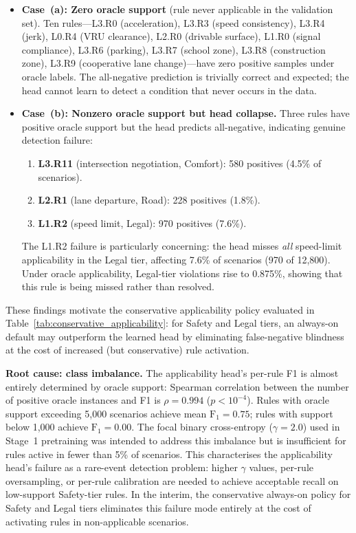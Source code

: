 \begin{itemize}[leftmargin=1.5em]
\item \textbf{Case~(a): Zero oracle support} (rule never applicable in the validation set).  Ten rules---L3.R0 (acceleration), L3.R3 (speed consistency), L3.R4 (jerk), L0.R4 (VRU clearance), L2.R0 (drivable surface), L1.R0 (signal compliance), L3.R6 (parking), L3.R7 (school zone), L3.R8 (construction zone), L3.R9 (cooperative lane change)---have zero positive samples under oracle labels.  The all-negative prediction is trivially correct and expected; the head cannot learn to detect a condition that never occurs in the data.

\item \textbf{Case~(b): Nonzero oracle support but head collapse.}  Three rules have positive oracle support but the head predicts all-negative, indicating genuine detection failure:
\begin{enumerate}[leftmargin=1.5em]
\item \textbf{L3.R11} (intersection negotiation, Comfort): 580 positives (4.5\% of scenarios).
\item \textbf{L2.R1} (lane departure, Road): 228 positives (1.8\%).
\item \textbf{L1.R2} (speed limit, Legal): 970 positives (7.6\%).
\end{enumerate}
The L1.R2 failure is particularly concerning: the head misses \emph{all} speed-limit applicability in the Legal tier, affecting 7.6\% of scenarios (970 of 12{,}800).  Under oracle applicability, Legal-tier violations rise to 0.875\%, showing that this rule is being missed rather than resolved.
\end{itemize}

\noindent These findings motivate the conservative applicability policy evaluated in Table~\ref{tab:conservative_applicability}: for Safety and Legal tiers, an always-on default may outperform the learned head by eliminating false-negative blindness at the cost of increased (but conservative) rule activation.

\noindent\textbf{Root cause: class imbalance.}  The applicability head's per-rule F1 is almost entirely determined by oracle support: Spearman correlation between the number of positive oracle instances and F1 is $\rho{=}0.994$ ($p < 10^{-4}$).  Rules with oracle support exceeding 5{,}000 scenarios achieve mean $\text{F}_1{=}0.75$; rules with support below 1{,}000 achieve $\text{F}_1{=}0.00$.  The focal binary cross-entropy ($\gamma{=}2.0$) used in Stage~1 pretraining was intended to address this imbalance but is insufficient for rules active in fewer than 5\% of scenarios.  This characterises the applicability head's failure as a rare-event detection problem: higher $\gamma$ values, per-rule oversampling, or per-rule calibration are needed to achieve acceptable recall on low-support Safety-tier rules.  In the interim, the conservative always-on policy for Safety and Legal tiers eliminates this failure mode entirely at the cost of activating rules in non-applicable scenarios.

